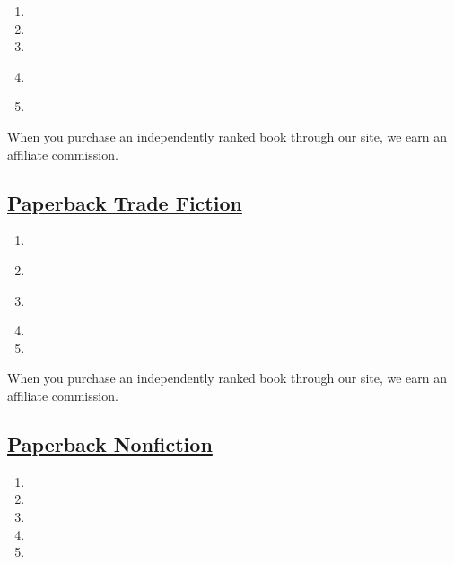 \begin{enumerate}
\def\labelenumi{\arabic{enumi}.}
\tightlist
\item
\item
\item
\item
  \href{https://www.nytimes.com/2019/08/20/books/review/how-to-be-an-antiracist-ibram-x-kendi.html}{}
\item
\end{enumerate}

When you purchase an independently ranked book through our site, we earn
an affiliate commission.

\hypertarget{paperback-trade-fiction}{%
\subsection{\texorpdfstring{\href{/books/best-sellers/trade-fiction-paperback/}{Paperback
Trade
Fiction}}{Paperback Trade Fiction}}\label{paperback-trade-fiction}}

\begin{enumerate}
\def\labelenumi{\arabic{enumi}.}
\tightlist
\item
\item
  \href{https://www.nytimes.com/2017/09/25/books/review/little-fires-everywhere-celeste-ng.html}{}
\item
  \href{https://www.nytimes.com/2019/07/11/books/review-nickel-boys-colson-whitehead.html}{}
\item
\item
\end{enumerate}

When you purchase an independently ranked book through our site, we earn
an affiliate commission.

\hypertarget{paperback-nonfiction}{%
\subsection{\texorpdfstring{\href{/books/best-sellers/paperback-nonfiction/}{Paperback
Nonfiction}}{Paperback Nonfiction}}\label{paperback-nonfiction}}

\begin{enumerate}
\def\labelenumi{\arabic{enumi}.}
\tightlist
\item
\item
\item
\item
\item
\end{enumerate}

